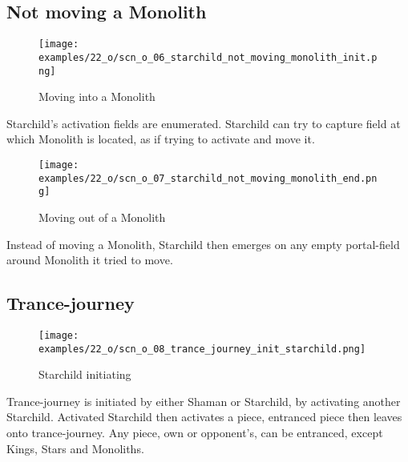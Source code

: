 \vspace*{2.1\baselineskip}
\subsection*{Not moving a Monolith}

\vspace*{-0.9\baselineskip}
\noindent
\begin{wrapfigure}[5]{l}{0.4\textwidth}
\centering
\texttt{[image: examples/22\_o/scn\_o\_06\_starchild\_not\_moving\_monolith\_init.png]}
\caption{Moving into a Monolith}
\label{fig:scn_o_06_starchild_not_moving_monolith_init}
\end{wrapfigure}
Starchild’s activation fields are enumerated. Starchild can try to capture field at which
Monolith is located, as if trying to activate and move it.

\vspace*{2.1\baselineskip}
\noindent
\begin{wrapfigure}[4]{l}{0.4\textwidth}
\centering
\texttt{[image: examples/22\_o/scn\_o\_07\_starchild\_not\_moving\_monolith\_end.png]}
\caption{Moving out of a Monolith}
\label{fig:scn_o_07_starchild_not_moving_monolith_end}
\end{wrapfigure}
Instead of moving a Monolith, Starchild then emerges on any empty portal-field around Monolith
it tried to move.

\clearpage %

\subsection*{Trance-journey}

\vspace*{-1.1\baselineskip}
\noindent
\begin{wrapfigure}[11]{l}{0.4\textwidth}
\centering
\texttt{[image: examples/22\_o/scn\_o\_08\_trance\_journey\_init\_starchild.png]}
\caption{Starchild initiating}
\label{fig:scn_o_08_trance_journey_init_starchild}
\end{wrapfigure}
Trance-journey is initiated by either Shaman or Starchild, by activating another Starchild.
Activated Starchild then activates a piece, entranced piece then leaves onto trance-journey.
Any piece, own or opponent's, can be entranced, except Kings, Stars and Monoliths.

